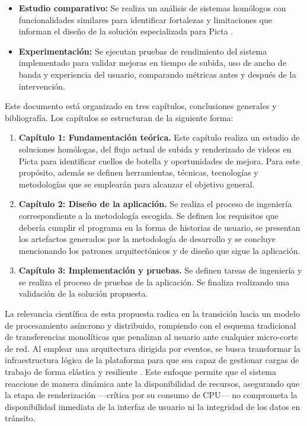 \begin{itemize}
  \item \textbf{Estudio comparativo:} Se realiza un análisis de sistemas homólogos con 
  funcionalidades similares para identificar fortalezas y limitaciones que informan el diseño de 
  la solución especializada para Picta \citep{Wohlin2012}.

  \item \textbf{Experimentación:} Se ejecutan pruebas de rendimiento del sistema implementado 
  para validar mejoras en tiempo de subida, uso de ancho de banda y experiencia del usuario, 
  comparando métricas antes y después de la intervención.
\end{itemize}

Este documento está organizado en tres capítulos, conclusiones generales y bibliografía. Los
capítulos se estructuran de la siguiente forma:

\begin{enumerate}
  \item \textbf{Capítulo 1: Fundamentación teórica.} Este capítulo realiza un estudio de soluciones
  homólogas, del flujo actual de subida y renderizado de videos en Picta para identificar cuellos de
  botella y oportunidades de mejora. Para este propósito, además se definen herramientas, técnicas,
  tecnologías y metodologías que se emplearán para alcanzar el objetivo general.

  \item \textbf{Capítulo 2: Diseño de la aplicación.} Se realiza el proceso de ingeniería
  correspondiente a la metodología escogida. Se definen los requisitos que debería cumplir el
  programa en la forma de historias de usuario, se presentan los artefactos generados por la
  metodología de desarrollo y se concluye mencionando los patrones arquitectónicos y de diseño que
  sigue la aplicación.

  \item \textbf{Capítulo 3: Implementación y pruebas.} Se definen tareas de ingeniería y se realiza
  el proceso de pruebas de la aplicación. Se finaliza realizando una validación de la solución
  propuesta.
\end{enumerate}

La relevancia científica de esta propuesta radica en la transición hacia un modelo de procesamiento
asíncrono y distribuido, rompiendo con el esquema tradicional de transferencias monolíticas que
penalizan al usuario ante cualquier micro-corte de red. Al emplear una arquitectura dirigida por
eventos, se busca transformar la infraestructura lógica de la plataforma para que sea capaz de
gestionar cargas de trabajo de forma elástica y resiliente \citep{Richards2020}. Este enfoque
permite que el sistema reaccione de manera dinámica ante la disponibilidad de recursos, asegurando
que la etapa de renderización ---crítica por su consumo de CPU--- no comprometa la disponibilidad
inmediata de la interfaz de usuario ni la integridad de los datos en tránsito.

